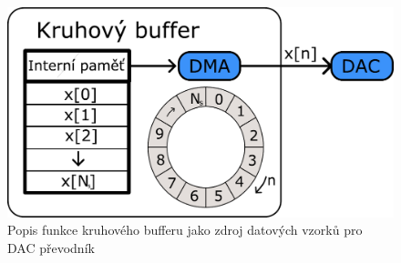 \begin{figure}[H]
	\centering
	\includegraphics[width=0.55\linewidth]{Figs/Diagrams/SVG/CircularBufferDMA.pdf}
	\caption{Popis funkce kruhového bufferu jako zdroj datových vzorků pro DAC převodník}
	\label{fig:circularBuffer}
\end{figure}



\begin{figure}[H]
\begin{minipage}{0.3\linewidth}
	\centering

\end{minipage}
\end{figure}
